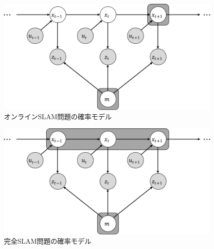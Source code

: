 \documentclass[dvipdfmx,a4paper]{jsarticle}
\begin{document}
\begin{figure}[htbp]
	\centering
	\includegraphics[keepaspectratio, scale=0.5]{figures/online-slam.pdf}
	\caption{オンラインSLAM問題の確率モデル}
	\label{fig:online-slam}
\end{figure}

\begin{figure}[htbp]
	\centering
	\includegraphics[keepaspectratio, scale=0.5]{figures/full-slam.pdf}
	\caption{完全SLAM問題の確率モデル}
	\label{fig:full-slam}
\end{figure}
\end{document}
